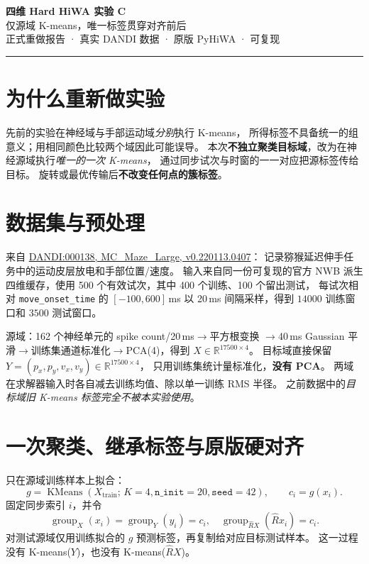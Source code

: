 \documentclass[UTF8,zihao=-4,a4paper]{ctexart}
\newcommand{\R}{\mathbb{R}}
\begin{document}
\begin{center}
{\Huge\bfseries\color{titlec}四维 Hard HiWA 实验 C}\\[7pt]
{\LARGE 仅源域 K-means，唯一标签贯穿对齐前后}\\[14pt]
{\small 正式重做报告 · 真实 DANDI 数据 · 原版 PyHiWA · 可复现}\\
\end{center}
\noindent\rule{\linewidth}{0.6pt}

\section{为什么重新做实验}
先前的实验在神经域与手部运动域\emph{分别}执行 K-means，
所得标签不具备统一的组意义；用相同颜色比较两个域因此可能误导。
本次\textbf{不独立聚类目标域}，改为在神经源域执行\emph{唯一的一次 K-means}，
通过同步试次与时窗的一一对应把源标签传给目标。
旋转或最优传输后\textbf{不改变任何点的簇标签}。

\noindent{}

\section{数据集与预处理}
来自 \href{https://dandiarchive.org/dandiset/000138/0.220113.0407}
{DANDI:000138, MC\_Maze\_Large, v0.220113.0407}：
记录猕猴延迟伸手任务中的运动皮层放电和手部位置/速度。
输入来自同一份可复现的官方 NWB 派生四维缓存，使用
500 个有效试次，其中 400 个训练、100 个留出测试，
每试次相对 \texttt{move\_onset\_time} 的
$[-100,600]$\,ms 以 20\,ms 间隔采样，得到
$14000$ 训练窗口和 $3500$ 测试窗口。

源域：162 个神经单元的 spike count/20\,ms$\to$平方根变换
$\to$40\,ms Gaussian 平滑$\to$训练集通道标准化$\to$PCA(4)，得到
$X\in\R^{17500\times4}$。
目标域直接保留
$Y=(p_x,p_y,v_x,v_y)\in\R^{17500\times4}$，
只用训练集统计量标准化，\textbf{没有 PCA}。
两域在求解器输入时各自减去训练均值、除以单一训练 RMS 半径。
之前数据中的\emph{目标域旧 K-means 标签完全不被本实验使用}。

\section{一次聚类、继承标签与原版硬对齐}
只在源域训练样本上拟合：
\begin{equation}
 g=\operatorname{KMeans}(X_{\mathrm{train}};\,K=4,
 \texttt{n\_init}=20,\texttt{seed}=42),\qquad
 c_i=g(x_i).
\end{equation}
固定同步索引 $i$，并令
\begin{equation}
 \boxed{\operatorname{group}_X(x_i)=
        \operatorname{group}_Y(y_i)=c_i,\quad
        \operatorname{group}_{\widehat RX}(\widehat R x_i)=c_i.}
\end{equation}
对测试源域仅用训练拟合的 $g$ 预测标签，再复制给对应目标测试样本。
这一过程没有 K-means($Y$)，也没有 K-means($\widehat RX$)。
\end{document}

